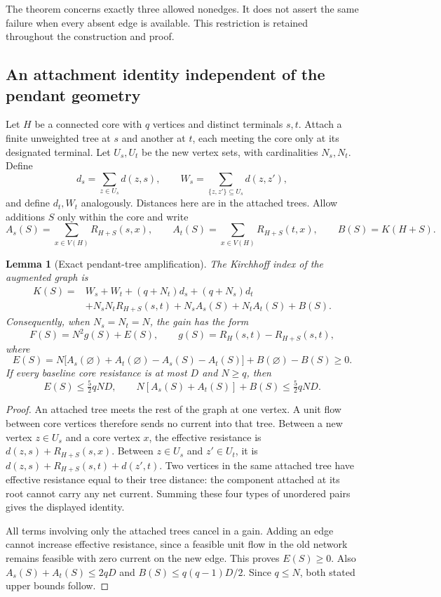 \documentclass[11pt,a4paper]{article}
\newtheorem{lemma}[theorem]{Lemma}
\theoremstyle{definition}\newtheorem{definition}[theorem]{Definition}
\theoremstyle{remark}\newtheorem{remark}[theorem]{Remark}
\numberwithin{equation}{section}
\begin{document}
The theorem concerns exactly three allowed nonedges.  It does not assert the
same failure when every absent edge is available.  This restriction is retained
throughout the construction and proof.

\subsection{An attachment identity independent of the pendant geometry}

Let $H$ be a connected core with $q$ vertices and distinct terminals $s,t$.
Attach a finite unweighted tree at $s$ and another at $t$, each meeting the core
only at its designated terminal.  Let $U_s,U_t$ be the new vertex sets, with
cardinalities $N_s,N_t$.  Define
\[
 d_s=\sum_{z\in U_s}d(z,s),\qquad
 W_s=\sum_{\{z,z'\}\subseteq U_s}d(z,z'),
\]
and define $d_t,W_t$ analogously.  Distances here are in the attached trees.
Allow additions $S$ only within the core and write
\[
 A_s(S)=\sum_{x\in V(H)}R_{H+S}(s,x),\qquad
 A_t(S)=\sum_{x\in V(H)}R_{H+S}(t,x),\qquad B(S)=K(H+S).
\]

\begin{lemma}[Exact pendant-tree amplification]
\label{ext-taisho-amplification}
The Kirchhoff index of the augmented graph is
\begin{align*}
 K(S)={}&W_s+W_t+(q+N_t)d_s+(q+N_s)d_t\\
       &+N_sN_tR_{H+S}(s,t)+N_sA_s(S)+N_tA_t(S)+B(S).
\end{align*}
Consequently, when $N_s=N_t=N$, the gain has the form
\[
 F(S)=N^2g(S)+E(S),\qquad
 g(S)=R_H(s,t)-R_{H+S}(s,t),
\]
where
\[
 E(S)=N\bigl[A_s(\varnothing)+A_t(\varnothing)-A_s(S)-A_t(S)\bigr]
       +B(\varnothing)-B(S)\ge0.
\]
If every baseline core resistance is at most $D$ and $N\ge q$, then
\[
 E(S)\le\tfrac52qND,
 \qquad N[A_s(S)+A_t(S)]+B(S)\le\tfrac52qND.
\]
\end{lemma}
\begin{proof}
An attached tree meets the rest of the graph at one vertex.  A unit flow between
core vertices therefore sends no current into that tree.  Between a new vertex
$z\in U_s$ and a core vertex $x$, the effective resistance is
$d(z,s)+R_{H+S}(s,x)$.  Between $z\in U_s$ and $z'\in U_t$, it is
$d(z,s)+R_{H+S}(s,t)+d(z',t)$.  Two vertices in the same attached tree have
effective resistance equal to their tree distance: the component attached at its
root cannot carry any net current.  Summing these four types of unordered pairs
gives the displayed identity.

All terms involving only the attached trees cancel in a gain.  Adding an edge
cannot increase effective resistance, since a feasible unit flow in the old
network remains feasible with zero current on the new edge.  This proves
$E(S)\ge0$.  Also $A_s(S)+A_t(S)\le2qD$ and
$B(S)\le q(q-1)D/2$.  Since $q\le N$, both stated upper bounds follow.
\end{proof}
\end{document}
